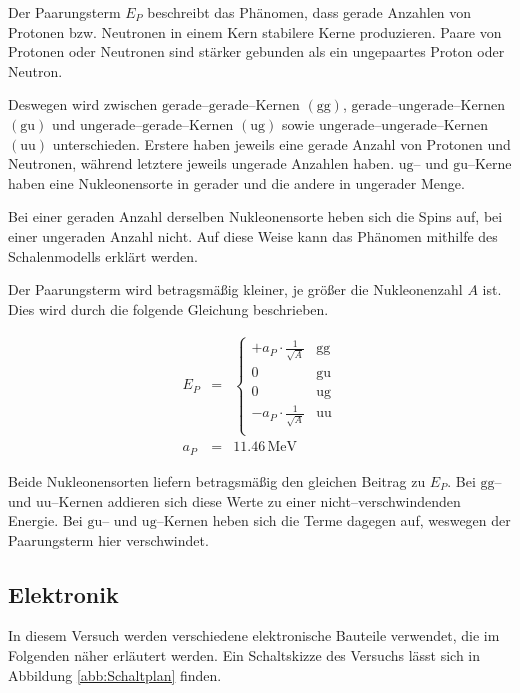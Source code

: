 \documentclass[12pt,a4paper]{scrartcl}
\numberwithin{equation}{section} %
\begin{document}
Der Paarungsterm $E_P$ beschreibt das Phänomen, dass gerade Anzahlen von Protonen bzw. Neutronen in einem Kern stabilere Kerne produzieren. Paare von Protonen oder Neutronen sind stärker gebunden als ein ungepaartes Proton oder Neutron.

Deswegen wird zwischen $\mathrm{gerade}$--$\mathrm{gerade}$--Kernen $(\mathrm{gg})$, $\mathrm{gerade}$--$\mathrm{ungerade}$--Kernen $(\mathrm{gu})$ und $\mathrm{ungerade}$--$\mathrm{gerade}$--Kernen $(\mathrm{ug})$ sowie $\mathrm{ungerade}$--$\mathrm{ungerade}$--Kernen $(\mathrm{uu})$ unterschieden. Erstere haben jeweils eine gerade Anzahl von Protonen und Neutronen, während letztere jeweils ungerade Anzahlen haben. $\mathrm{ug}$-- und $\mathrm{gu}$--Kerne haben eine Nukleonensorte in gerader und die andere in ungerader Menge.

Bei einer geraden Anzahl derselben Nukleonensorte heben sich die Spins auf, bei einer ungeraden Anzahl nicht. Auf diese Weise kann das Phänomen mithilfe des Schalenmodells erklärt werden.

Der Paarungsterm wird betragsmäßig kleiner, je größer die Nukleonenzahl $A$ ist. Dies wird durch die folgende Gleichung beschrieben.

\begin{eqnarray}
	E_P &=&
	\begin{cases}
		+ a_P\cdot \frac{1}{\sqrt{A}} & \text{gg} \\
		0 & \text{gu} \\
		0 & \text{ug} \\
		- a_P\cdot \frac{1}{\sqrt{A}} & \text{uu} \\
	\end{cases}
	\label{Paarungsterm} \\
	a_P &=& 11.46\mathrm{\,MeV}
\end{eqnarray}

\noindent
Beide Nukleonensorten liefern betragsmäßig den gleichen Beitrag zu $E_P$. Bei $\mathrm{gg}$-- und $\mathrm{uu}$--Kernen addieren sich diese Werte zu einer nicht--verschwindenden Energie. Bei $\mathrm{gu}$-- und $\mathrm{ug}$--Kernen heben sich die Terme dagegen auf, weswegen der Paarungsterm hier verschwindet.

\hypertarget{elektronik}{%
\subsection{Elektronik}\label{elektronik}}

In diesem Versuch werden verschiedene elektronische Bauteile verwendet, die im Folgenden näher erläutert werden. Ein Schaltskizze des Versuchs lässt sich in Abbildung \ref{abb:Schaltplan} finden.
\end{document}
